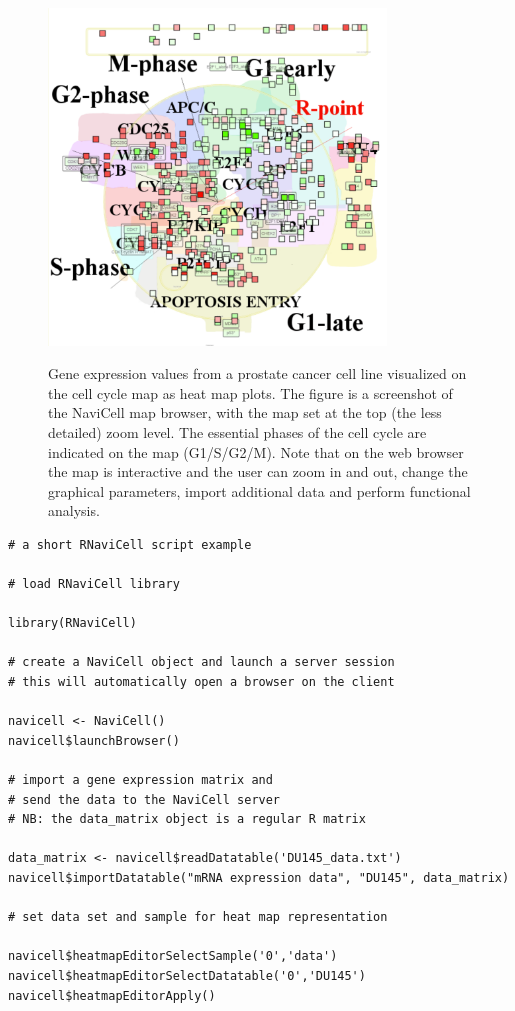 \documentclass[article]{jss}
\begin{document}
\begin{figure}[!ht]
  \caption{Gene expression values from a prostate cancer cell line visualized
on the cell cycle map as heat map plots. The figure is a screenshot of the
NaviCell map browser, with the map set at the top (the less detailed) zoom
level. The essential phases of the cell cycle are indicated on the map
(G1/S/G2/M). Note that on the web browser the map is interactive and the user
can zoom in and out, change the graphical parameters, import additional data
and perform functional analysis.  } 
\centering
  \includegraphics[width=0.8\textwidth]{figures/heatmap.pdf}
  \label{fig:du145}
\end{figure}



\begin{verbatim}
# a short RNaviCell script example

# load RNaviCell library

library(RNaviCell)

# create a NaviCell object and launch a server session
# this will automatically open a browser on the client 

navicell <- NaviCell()
navicell$launchBrowser()

# import a gene expression matrix and 
# send the data to the NaviCell server
# NB: the data_matrix object is a regular R matrix

data_matrix <- navicell$readDatatable('DU145_data.txt')
navicell$importDatatable("mRNA expression data", "DU145", data_matrix)

# set data set and sample for heat map representation

navicell$heatmapEditorSelectSample('0','data')
navicell$heatmapEditorSelectDatatable('0','DU145')
navicell$heatmapEditorApply()

\end{verbatim}
\end{document}

